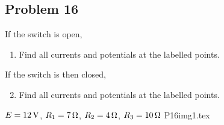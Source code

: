 \subsection*{Problem 16}
If the switch is open,
\begin{enumerate}
    \item Find all currents and potentials at the labelled points.
\end{enumerate}
If the switch is then closed,
\begin{enumerate}
    \setcounter{enumi}{1}
    \item Find all currents and potentials at the labelled points.
\end{enumerate}
$E=12\,\mathrm{V}$, $R_1=7\,\mathrm{\Omega}$, $R_2=4\,\mathrm{\Omega}$, $R_3=10\,\mathrm{\Omega}$
{P16img1.tex}

